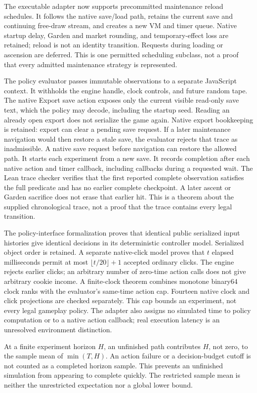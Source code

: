 \documentclass[11pt,a4paper]{article}
\numberwithin{equation}{section}
\theoremstyle{definition}
\theoremstyle{remark}
\begin{document}
The executable adapter now supports precommitted maintenance reload schedules. It follows the native save/load path, retains the current save and continuing free-draw stream, and creates a new VM and timer queue. Native startup delay, Garden and market rounding, and temporary-effect loss are retained; reload is not an identity transition. Requests during loading or ascension are deferred. This is one permitted scheduling subclass, not a proof that every admitted maintenance strategy is represented.

The policy evaluator passes immutable observations to a separate JavaScript context. It withholds the engine handle, clock controls, and future random tape. The native Export save action exposes only the current visible read-only save text, which the policy may decode, including the startup seed. Reading an already open export does not serialize the game again. Native export bookkeeping is retained: export can clear a pending save request. If a later maintenance navigation would then restore a stale save, the evaluator rejects that trace as inadmissible. A native save request before navigation can restore the allowed path. It starts each experiment from a new save. It records completion after each native action and timer callback, including callbacks during a requested wait. The Lean trace checker verifies that the first reported complete observation satisfies the full predicate and has no earlier complete checkpoint. A later ascent or Garden sacrifice does not erase that earlier hit. This is a theorem about the supplied chronological trace, not a proof that the trace contains every legal transition.

The policy-interface formalization proves that identical public serialized input histories give identical decisions in its deterministic controller model. Serialized object order is retained. A separate native-click model proves that $t$ elapsed milliseconds permit at most $\lfloor t/20\rfloor+1$ accepted ordinary clicks. The engine rejects earlier clicks; an arbitrary number of zero-time action calls does not give arbitrary cookie income. A finite-clock theorem combines monotone binary64 clock ranks with the evaluator's same-time action cap. Fourteen native clock and click projections are checked separately. This cap bounds an experiment, not every legal gameplay policy. The adapter also assigns no simulated time to policy computation or to a native action callback; real execution latency is an unresolved environment distinction.

At a finite experiment horizon $H$, an unfinished path contributes $H$, not zero, to the sample mean of $\min(T,H)$. An action failure or a decision-budget cutoff is not counted as a completed horizon sample. This prevents an unfinished simulation from appearing to complete quickly. The restricted sample mean is neither the unrestricted expectation nor a global lower bound.
\end{document}
